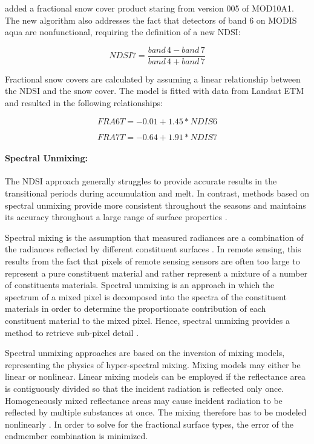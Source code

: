 \documentclass[letterpaper, parskip=half]{scrartcl}
\begin{document}
\cite{Salomonson2006, Salomonson2004} added a fractional snow cover product staring from version 005 of MOD10A1. The new algorithm also addresses the fact that detectors of band 6 on \gls{MODIS} aqua are nonfunctional, requiring the definition of a new \gls{NDSI}:

\begin{equation}
 NDSI7 = \frac{band \, 4 -band \, 7}{band \, 4 + band \, 7}
\end{equation}

Fractional snow covers are calculated by assuming a linear relationship between the \gls{NDSI} and the snow cover. The model is fitted with data from Landsat \gls{ETM} and resulted in the following relationships:

\begin{equation}
    FRA6T = -0.01 + 1.45 * NDIS6
\end{equation}

\begin{equation}
    FRA7T = -0.64 + 1.91 * NDIS7
\end{equation}

\paragraph{Spectral Unmixing:}
The \gls{NDSI} approach generally struggles to provide accurate results in the transitional periods during accumulation and melt. In contrast, methods based on spectral unmixing provide more consistent throughout the seasons and maintains its accuracy throughout a large range of surface properties \citep{Rittger2013}.

Spectral mixing is the assumption that measured radiances are a combination of the radiances reflected by different constituent surfaces \citep{Dozier2004}.
In remote sensing, this results from the fact that pixels of remote sensing sensors are often too large to represent a pure constituent material and rather represent a mixture of a number of constituents materials. Spectral unmixing is an approach in which the spectrum of a mixed pixel is decomposed into the spectra of the constituent materials in order to determine the proportionate contribution of each constituent material to the mixed pixel. Hence, spectral unmixing provides a method to retrieve sub-pixel detail \citep{Keshava2003}.

Spectral unmixing approaches are based on the inversion of mixing models, representing the physics of hyper-spectral mixing. Mixing models may either be linear or nonlinear. Linear mixing models can be employed if the reflectance area is contiguously divided so that the incident radiation is reflected only once. Homogeneously mixed reflectance areas may cause incident radiation to be reflected by multiple substances at once. The mixing therefore has to be modeled nonlinearly \citep{Keshava2003}.
In order to solve for the fractional surface types, the error of the endmember combination is minimized.
\end{document}
